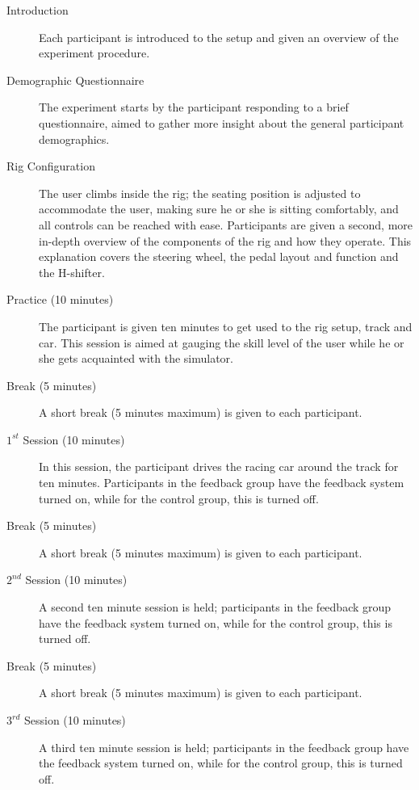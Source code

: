 \begin{description}
	\item[Introduction] Each participant is introduced to the setup and given an overview of the experiment procedure. 

	\item[Demographic Questionnaire] The experiment starts by the participant responding to a brief questionnaire, aimed to gather more insight about the general participant demographics.
	
	\item[Rig Configuration] 
	The user climbs inside the rig; the seating position is adjusted to accommodate the user, making sure he or she is sitting comfortably, and all controls can be reached with ease. Participants are given a second, more in-depth overview of the components of the rig and how they operate. This explanation covers the steering wheel, the pedal layout and function and the H-shifter.
	
	\item[Practice (10 minutes)] The participant is given ten minutes to get used to the rig setup, track and car. This session is aimed at gauging the skill level of the user while he or she gets acquainted with the simulator.
	
	\item[Break (5 minutes)] A short break (5 minutes maximum) is given to each participant.
	
	\item[$1^{st}$ Session (10 minutes)] In this session, the participant drives the racing car around the track for ten minutes. Participants in the feedback group have the feedback system turned on, while for the control group, this is turned off.
	
	\item[Break (5 minutes)] A short break (5 minutes maximum) is given to each participant.

	\item[$2^{nd}$ Session (10 minutes)] A second ten minute session is held; participants in the feedback group have the feedback system turned on, while for the control group, this is turned off.
	
	\item[Break (5 minutes)] A short break (5 minutes maximum) is given to each participant.

	\item[$3^{rd}$ Session (10 minutes)] A third ten minute session is held; participants in the feedback group have the feedback system turned on, while for the control group, this is turned off.
		

\end{description}
